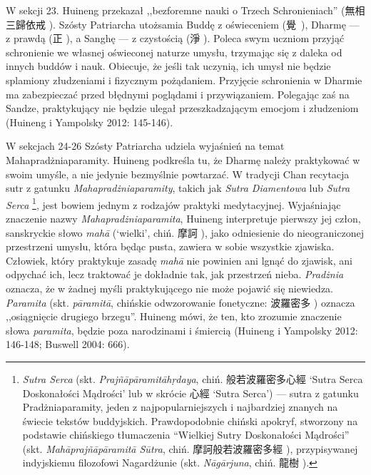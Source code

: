 W sekcji 23. Huineng przekazał ,,bezforemne nauki o Trzech Schronieniach\fnm'' (無相三歸依戒 ).
Szósty Patriarcha utożsamia Buddę z oświeceniem (覺~), Dharmę --- z prawdą (正 ), a Sanghę --- z czystością (淨 ).
Poleca swym uczniom przyjąć schronienie we własnej oświeconej naturze umysłu, trzymając się z daleka od innych buddów i nauk.
Obiecuje, że jeśli tak uczynią, ich umysł nie będzie splamiony złudzeniami i fizycznym pożądaniem.
Przyjęcie schronienia w Dharmie ma zabezpieczać przed błędnymi poglądami i przywiązaniem.
Polegając zaś na Sandze, praktykujący nie będzie ulegał przeszkadzającym emocjom i złudzeniom
(Huineng i Yampolsky 2012: 145-146).

W sekcjach 24-26 Szósty Patriarcha udziela wyjaśnień na temat Mahapradżniaparamity.
Huineng podkreśla tu, że Dharmę należy praktykować w swoim umyśle, a nie jedynie bezmyślnie powtarzać.
W tradycji Chan recytacja sutr z gatunku \textit{Mahapradżniaparamity}, takich jak \textit{Sutra Diamentowa} lub \textit{Sutra Serca}%
\footnote{\textit{Sutra Serca}\label{HeartSutra} (skt. \textit{Prajñāpāramitāh\d{r}daya}, chiń. 般若波羅密多心經  `Sutra Serca Doskonałości Mądrości' lub w skrócie 心經  `Sutra Serca') --- sutra z gatunku Pradżniaparamity, jeden z najpopularniejszych i najbardziej znanych na świecie tekstów buddyjskich. Prawdopodobnie chiński apokryf, stworzony na podstawie chińskiego tłumaczenia ``Wielkiej Sutry Doskonałości Mądrości'' (skt. \textit{Mahāprajñāpāramitā Sūtra}, chiń. 摩訶般若波羅密多經 ), przypisywanej indyjskiemu filozofowi Nagardżunie (skt. \textit{Nāgārjuna}, chiń. 龍樹 ).},
jest bowiem jednym z rodzajów praktyki medytacyjnej.
Wyjaśniając znaczenie nazwy \textit{Mahapradżniaparamita}, Huineng interpretuje pierwszy jej człon, sanskryckie słowo \textit{mahā} (`wielki', chiń. 摩訶 ), jako odniesienie do nieograniczonej przestrzeni umysłu, która będąc pusta, zawiera w sobie wszystkie zjawiska.
Człowiek, który praktykuje zasadę \textit{mahā} nie powinien ani lgnąć do zjawisk, ani odpychać ich, lecz traktować je dokładnie tak, jak przestrzeń nieba.
\textit{Pradżnia} oznacza, że w żadnej myśli praktykującego nie może pojawić się niewiedza.
\textit{Paramita} (skt. \textit{pāramitā}, chińskie odwzorowanie fonetyczne: 波羅密多 ) oznacza ,,osiągnięcie drugiego brzegu''.
Huineng mówi, że ten, kto zrozumie znaczenie słowa \textit{paramita}, będzie poza narodzinami i śmiercią
(Huineng i Yampolsky 2012: 146-148; Buswell 2004: 666).

